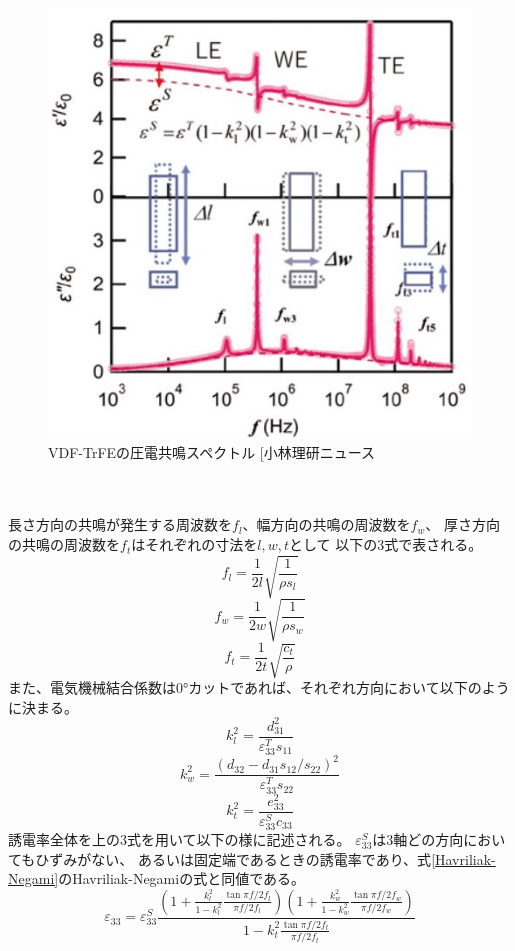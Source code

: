 \documentclass[dvipdfmx,12pt,a4paper]{jreport}
\makeatletter
\DeclareRobustCommand\cite{\unskip
    	\@ifnextchar[{\@tempswatrue\@citex}{\@tempswafalse\@citex[]}}
\makeatother
\begin{document}
			\begin{figure}[h]
				\centering
				\includegraphics[width=0.5\linewidth]{VDF_TrFe_圧電共鳴.jpg}
				\caption{VDF-TrFEの圧電共鳴スペクトル\cite{小林理研ニュース}}
				\label{VDF-TrFEの圧電共鳴スペクトル}
			\end{figure}
			\\ \\
			長さ方向の共鳴が発生する周波数を$f_l$、幅方向の共鳴の周波数を$f_w$、
			厚さ方向の共鳴の周波数を$f_t$はそれぞれの寸法を$l, w, t$として
			以下の3式で表される。
			\begin{equation}
				f_l = \frac{1}{2l}\sqrt{\frac{1}{\rho s_l}}
			\end{equation} 
			\begin{equation}
				f_w = \frac{1}{2w}\sqrt{\frac{1}{\rho s_w}}
			\end{equation}
			\begin{equation}
				f_t = \frac{1}{2t}\sqrt{\frac{c_t}{\rho}}
			\end{equation} 
			また、電気機械結合係数は0°カットであれば、それぞれ方向において以下のように決まる。
			\begin{equation}
				k_l^2 = \frac{d_{31}^2}{\varepsilon_{33}^T s_{11}}
			\end{equation}
			\begin{equation}
				k_w^2 = \frac{\left(d_{32} - d_{31}s_{12}/s_{22} \right)^2}
				{\varepsilon_{33}^T s_{22}}
			\end{equation}
			\begin{equation}
				k_t^2 = \frac{e_{33}^2}{\varepsilon_{33}^S c_{33}}
			\end{equation}
			誘電率全体を上の3式を用いて以下の様に記述される。
			$\varepsilon_{33}^S$は3軸どの方向においてもひずみがない、
			あるいは固定端であるときの誘電率であり、式\eqref{Havriliak-Negami}のHavriliak-Negamiの式と同値である。
			\begin{equation}
				\varepsilon_{33} =
				\varepsilon_{33}^S
				\frac{\left(1+\frac{k_l^2}{1-k_l^2}\frac{\tan{\pi f/2f_l}}{\pi f/2f_l}\right)
				\left( 
					1+\frac{k_w^2}{1-k_w^2}\frac{\tan{\pi f/2f_w}}{\pi f/2f_w}
				\right)
				}
				{1-k_t^2\frac{\tan{\pi f/2f_t}}{\pi f/2f_t}}
				\label{normal_piezo_resonance}
			\end{equation}
\end{document}
